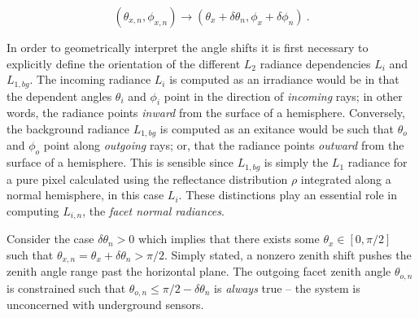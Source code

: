 \documentclass{article}
\numberwithin{equation}{section}
\begin{document}
        \begin{equation} \label{angleshift}
            (\theta_{x, n}, \phi_{x, n}) \longrightarrow (\theta_x + \delta\theta_n, \phi_x + \delta\phi_n)\ .
        \end{equation}

        In order to geometrically interpret the angle shifts it is first necessary to explicitly define the
        orientation of the different $L_2$ radiance dependencies $L_i$ and $L_{1, bg}$.
        The incoming radiance $L_i$ is computed as an irradiance would be in that the dependent angles $\theta_i$ 
        and $\phi_i$ point in the direction of \textit{incoming} rays; in other words, the radiance points 
        \textit{inward} from the surface of a hemisphere.
        Conversely, the background radiance $L_{1, bg}$ is computed as an exitance would be such that $\theta_o$
        and $\phi_o$ point along \textit{outgoing} rays; or, that the radiance points \textit{outward} from the
        surface of a hemisphere.
        This is sensible since $L_{1, bg}$ is simply the $L_1$ radiance for a pure pixel calculated using the 
        reflectance distribution $\rho$ integrated along a normal hemisphere, in this case $L_i$.
        These distinctions play an essential role in computing $L_{i, n}$, the \textit{facet normal radiances}.

        Consider the case $\delta\theta_n > 0$ which implies that there exists some $\theta_x \in [0, \pi/2]$
        such that $\theta_{x, n} = \theta_x + \delta\theta_n > \pi/2$.
        Simply stated, a nonzero zenith shift pushes the zenith angle range past the horizontal plane.
        The outgoing facet zenith angle $\theta_{o, n}$ is constrained such that
        $\theta_{o, n} \leq \pi/2 - \delta\theta_n$ is \textit{always} true -- the system is unconcerned with
        underground sensors.
\end{document}
